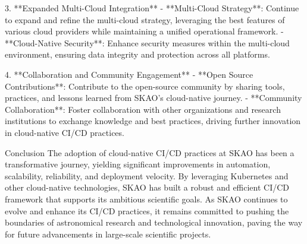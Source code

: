 \documentclass[a4paper]{spie}  %
\begin{document}
3. **Expanded Multi-Cloud Integration**
   - **Multi-Cloud Strategy**: Continue to expand and refine the multi-cloud strategy, leveraging the best features of various cloud providers while maintaining a unified operational framework.
   - **Cloud-Native Security**: Enhance security measures within the multi-cloud environment, ensuring data integrity and protection across all platforms.

4. **Collaboration and Community Engagement**
   - **Open Source Contributions**: Contribute to the open-source community by sharing tools, practices, and lessons learned from SKAO’s cloud-native journey.
   - **Community Collaboration**: Foster collaboration with other organizations and research institutions to exchange knowledge and best practices, driving further innovation in cloud-native CI/CD practices.

 Conclusion
The adoption of cloud-native CI/CD practices at SKAO has been a transformative journey, yielding significant improvements in automation, scalability, reliability, and deployment velocity. By leveraging Kubernetes and other cloud-native technologies, SKAO has built a robust and efficient CI/CD framework that supports its ambitious scientific goals. As SKAO continues to evolve and enhance its CI/CD practices, it remains committed to pushing the boundaries of astronomical research and technological innovation, paving the way for future advancements in large-scale scientific projects. \cite{Alred03}

\end{document}

